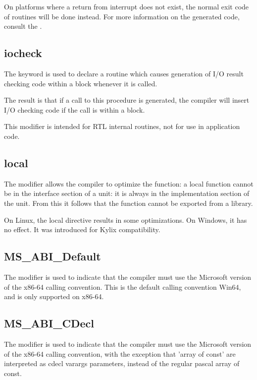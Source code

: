 On platforms where a return from interrupt does not exist, the normal exit
code of routines will be done instead. For more information on the generated
code, consult the \progref.

\subsection{iocheck}
\label{se:iocheck}
The  keyword is used to declare a routine which causes
generation of I/O result checking code within a 
block whenever it is called.

The result is that if a call to this procedure is generated, the compiler will
insert I/O checking code if the call is within a  block.

This modifier is intended for RTL internal routines, not for use in
application code.

\subsection{local}
\label{se:local}
The  modifier allows the compiler to optimize the function: a local
function cannot be in the interface section of a unit: it is always in the
implementation section of the unit. From this it follows that the function
cannot be exported from a library.

On Linux, the local directive results in some optimizations. On Windows, it
has no effect. It was introduced for Kylix compatibility.

\subsection{MS\_ABI\_Default}
The  modifier is used to indicate that the compiler must
use the Microsoft version of the x86-64 calling convention. This is the default
calling convention Win64, and is only supported on x86-64.


\subsection{MS\_ABI\_CDecl}
The  modifier is used to indicate that the compiler must
use the Microsoft version of the x86-64 calling convention, with the
exception that 'array of const' are interpreted as cdecl varargs parameters,
instead of the regular pascal array of const.





